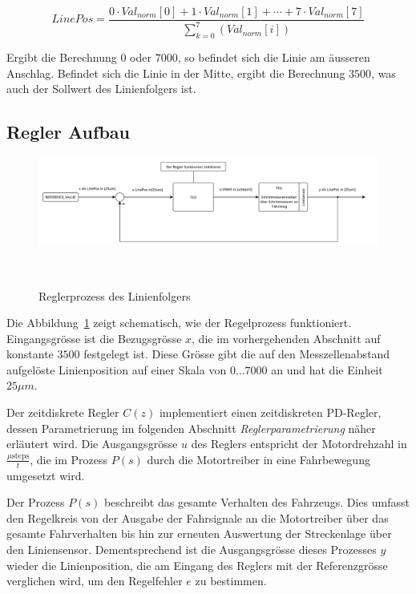 \documentclass[main.tex]{subfiles} %
\begin{document}
\[
    LinePos = \frac{0 \cdot Val_{norm}[0] + 1 \cdot Val_{norm}[1] + \cdots + 7 \cdot Val_{norm}[7]}{\sum_{k=0}^{7}(Val_{norm}[i])}
\]

Ergibt die Berechnung $0$ oder $7000$, so befindet sich die Linie am äusseren
Anschlag. Befindet sich die Linie in der Mitte, ergibt die Berechnung $3500$,
was auch der Sollwert des Linienfolgers ist.

\subsection*{Regler Aufbau}

\begin{figure}[H]
    \centering
    \includegraphics[width=1.0\linewidth]{fig_Parametrierung_Linienfolgeregler/RegelProzess_Linienfolger.pdf}
    \caption{Reglerprozess des Linienfolgers}~\label{fig:Linienfolger_RegelProzess}
\end{figure}

Die Abbildung~\ref{fig:Linienfolger_RegelProzess} zeigt schematisch, wie der
Regelprozess funktioniert. Eingangsgrösse ist die Bezugsgrösse $x$, die im
vorhergehenden Abschnitt auf konstante $3500$ festgelegt ist. Diese Grösse gibt
die auf den Messzellenabstand aufgelöste Linienposition auf einer Skala von $0
    \dots 7000$ an und hat die Einheit $25\mu m$.

Der zeitdiskrete Regler $C(z)$ implementiert einen zeitdiskreten PD-Regler,
dessen Parametrierung im folgenden Abschnitt \textit{Reglerparametrierung}
näher erläutert wird. Die Ausgangsgrösse $u$ des Reglers entspricht der
Motordrehzahl in $\frac{\mu \text{steps}}{t}$, die im Prozess $P(s)$ durch die
Motortreiber in eine Fahrbewegung umgesetzt wird.

Der Prozess $P(s)$ beschreibt das gesamte Verhalten des Fahrzeugs. Dies umfasst
den Regelkreis von der Ausgabe der Fahrsignale an die Motortreiber über das
gesamte Fahrverhalten bis hin zur erneuten Auswertung der Streckenlage über den
Liniensensor. Dementsprechend ist die Ausgangsgrösse dieses Prozesses $y$
wieder die Linienposition, die am Eingang des Reglers mit der Referenzgrösse
verglichen wird, um den Regelfehler $e$ zu bestimmen.
\end{document}
